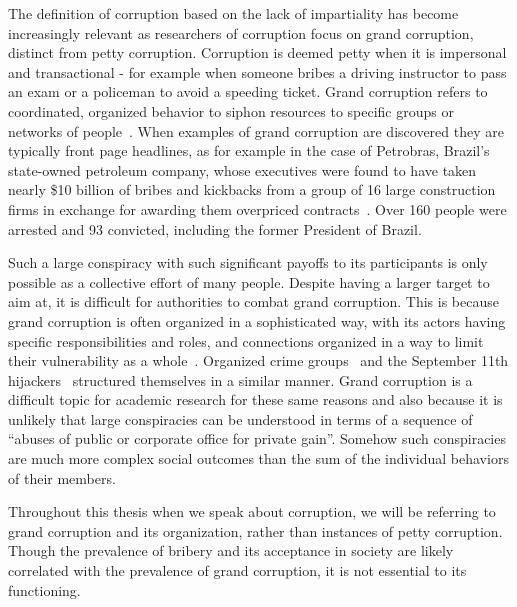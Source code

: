 The definition of corruption based on the lack of impartiality has become increasingly relevant as researchers of corruption focus on grand corruption, distinct from petty corruption. Corruption is deemed petty when it is impersonal and transactional - for example when someone bribes a driving instructor to pass an exam or a policeman to avoid a speeding ticket. Grand corruption refers to coordinated, organized behavior to siphon resources to specific groups or networks of people~\cite{Mungiu-pippidi2006,fazekas2016}. When examples of grand corruption are discovered they are typically front page headlines, as for example in the case of Petrobras, Brazil's state-owned petroleum company, whose executives were found to have taken nearly \$10 billion of bribes and kickbacks from a group of 16 large construction firms in exchange for awarding them overpriced contracts~\cite{watts2017operation,ribeiro2018dynamical}. Over 160 people were arrested and 93 convicted, including the former President of Brazil.

 Such a large conspiracy with such significant payoffs to its participants is only possible as a collective effort of many people. Despite having a larger target to aim at, it is difficult for authorities to combat grand corruption. This is because grand corruption is often organized in a sophisticated way, with its actors having specific responsibilities and roles, and connections organized in a way to limit their vulnerability as a whole~\cite{ferrali2018corruption}. Organized crime groups~\cite{calderoni2011strategic} and the September 11th hijackers~\cite{krebs2002mapping} structured themselves in a similar manner. Grand corruption is a difficult topic for academic research for these same reasons and also because it is unlikely that large conspiracies can be understood in terms of a sequence of ``abuses of public or corporate office for private gain''. Somehow such conspiracies are much more complex social outcomes than the sum of the individual behaviors of their members.
 
 Throughout this thesis when we speak about corruption, we will be referring to grand corruption and its organization, rather than instances of petty corruption. Though the prevalence of bribery and its acceptance in society are likely correlated with the prevalence of grand corruption, it is not essential to its functioning.

